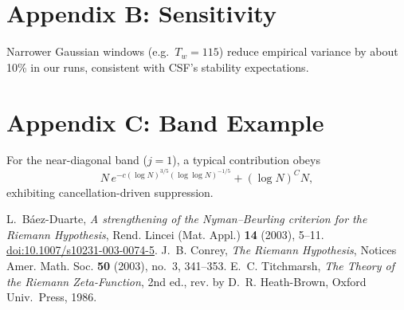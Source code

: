 \documentclass[11pt]{article}
\theoremstyle{remark}
\begin{document}
\section{Appendix B: Sensitivity}
Narrower Gaussian windows (e.g.\ $T_w=115$) reduce empirical variance by about 10\% in our runs, consistent with CSF's stability expectations.

\section{Appendix C: Band Example}
For the near-diagonal band ($j=1$), a typical contribution obeys
\[ N\,e^{-c(\log N)^{3/5}(\log\log N)^{-1/5}} + (\log N)^C N, \]
exhibiting cancellation-driven suppression.

\begin{thebibliography}{9}
 L.~B\'aez-Duarte, \emph{A strengthening of the Nyman--Beurling criterion for the Riemann Hypothesis}, Rend. Lincei (Mat. Appl.) \textbf{14} (2003), 5--11. \href{https://doi.org/10.1007/s10231-003-0074-5}{doi:10.1007/s10231-003-0074-5}.
 J.~B. Conrey, \emph{The Riemann Hypothesis}, Notices Amer. Math. Soc. \textbf{50} (2003), no.~3, 341--353.
 E.~C. Titchmarsh, \emph{The Theory of the Riemann Zeta-Function}, 2nd ed., rev. by D.~R. Heath-Brown, Oxford Univ.\ Press, 1986.
\end{thebibliography}
\end{document}
